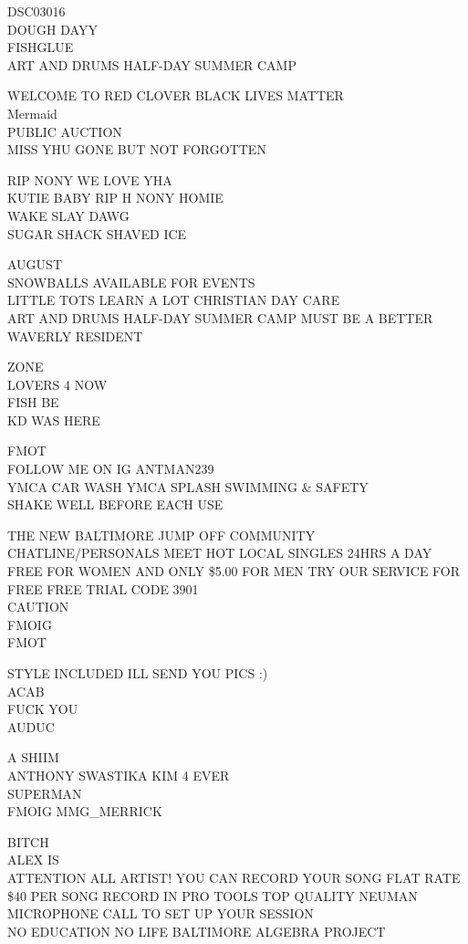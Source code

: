 \documentclass[10pt,letterpaper]{article}
\begin{document}
DSC03016\\
DOUGH DAYY\\
FISHGLUE\\
ART AND DRUMS HALF{-}DAY SUMMER CAMP

WELCOME TO RED CLOVER BLACK LIVES MATTER\\
Mermaid\\
PUBLIC AUCTION\\
MISS YHU GONE BUT NOT FORGOTTEN

RIP NONY WE LOVE YHA\\
KUTIE BABY RIP H NONY HOMIE\\
WAKE SLAY DAWG\\
SUGAR SHACK SHAVED ICE

AUGUST\\
SNOWBALLS AVAILABLE FOR EVENTS\\
LITTLE TOTS LEARN A LOT CHRISTIAN DAY CARE\\
ART AND DRUMS HALF{-}DAY SUMMER CAMP MUST BE A BETTER WAVERLY RESIDENT

ZONE\\
LOVERS 4 NOW\\
FISH BE\\
KD WAS HERE

FMOT\\
FOLLOW ME ON IG ANTMAN239\\
YMCA CAR WASH YMCA SPLASH SWIMMING \& SAFETY\\
SHAKE WELL BEFORE EACH USE

THE NEW BALTIMORE JUMP OFF COMMUNITY CHATLINE/PERSONALS MEET HOT LOCAL SINGLES 24HRS A DAY FREE FOR WOMEN AND ONLY \$5.00 FOR MEN TRY OUR SERVICE FOR FREE FREE TRIAL CODE 3901\\
CAUTION\\
FMOIG\\
FMOT

STYLE INCLUDED ILL SEND YOU PICS :)\\
ACAB\\
FUCK YOU\\
AUDUC

A SHIIM\\
ANTHONY SWASTIKA KIM 4 EVER\\
SUPERMAN\\
FMOIG MMG\_MERRICK

BITCH\\
ALEX IS\\
ATTENTION ALL ARTIST!  YOU CAN RECORD YOUR SONG FLAT RATE \$40 PER SONG RECORD IN PRO TOOLS TOP QUALITY NEUMAN MICROPHONE CALL TO SET UP YOUR SESSION\\
NO EDUCATION NO LIFE BALTIMORE ALGEBRA PROJECT
\end{document}
